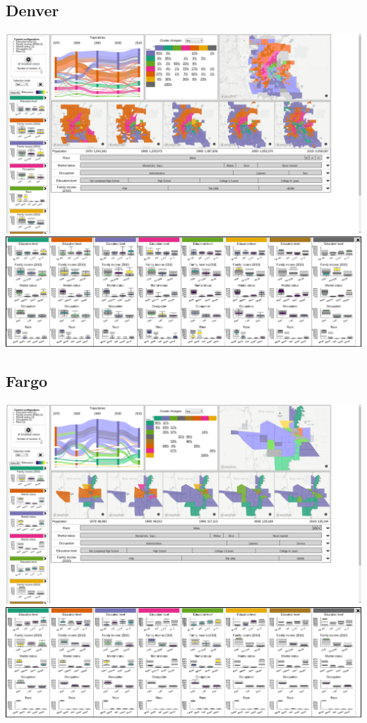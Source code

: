 \documentclass[a4paper]{article}
\begin{document}
\subsection{Denver}
\begin{center}
	\includegraphics[width=\linewidth]{23a.png}
	\includegraphics[width=\linewidth]{23b.png}
\end{center} \clearpage



\subsection{Fargo}
\begin{center}
	\includegraphics[width=\linewidth]{24a.png}
	\includegraphics[width=\linewidth]{24b.png}
\end{center} \clearpage
\end{document}
